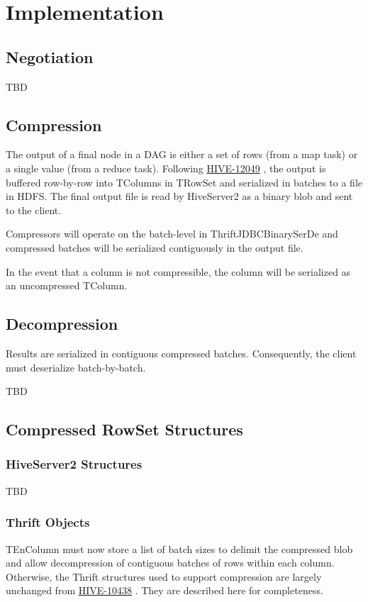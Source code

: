 \documentclass[11pt,a4paper]{article}
\begin{document}
\section{Implementation}

	\subsection{Negotiation}
		TBD
		
	\subsection{Compression}
		The output of a final node in a DAG is either a set of rows (from a map task) or a single value (from a reduce task).
		Following
		\href{https://issues.apache.org/jira/browse/HIVE-12049}{HIVE-12049}
		, the output is buffered row-by-row into TColumns in TRowSet and serialized in batches to a file in HDFS.
		The final output file is read by HiveServer2 as a binary blob and sent to the client.
		
		Compressors will operate on the batch-level in ThriftJDBCBinarySerDe and compressed batches will be serialized contiguously in the output file. 
		
		In the event that a column is not compressible, the column will be serialized as an uncompressed TColumn.
		
	\subsection{Decompression}
		Results are serialized in contiguous compressed batches. Consequently, the client must deserialize batch-by-batch.
		
		TBD
		
	\subsection{Compressed RowSet Structures}
		\subsubsection{HiveServer2 Structures}
			TBD
		
		\subsubsection{Thrift Objects}
			TEnColumn must now store a list of batch sizes to delimit the compressed blob and allow decompression of contiguous batches of rows within each column.
			Otherwise, the Thrift structures used to support compression are largely unchanged from 
			\href{https://issues.apache.org/jira/browse/HIVE-10438}{HIVE-10438}
			. They are described here for completeness.
			
\end{document}

